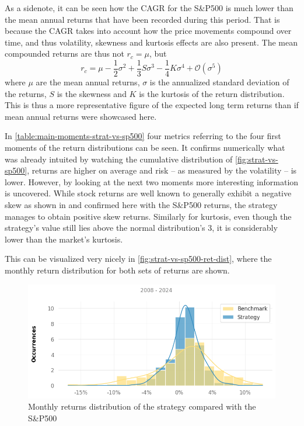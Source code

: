 As a sidenote, it can be seen how the CAGR for the S\&P500 is much lower than the mean annual returns that have been recorded during this period. That is because the CAGR takes into account how the price movements compound over time, and thus volatility, skewness and kurtosis effects are also present. The mean compounded returns are thus not $r_c=\mu$, but 
\begin{equation}
    r_c=\mu-\frac{1}{2}\sigma^2+\frac{1}{3}S\sigma^3-\frac{1}{4}K\sigma^4  + \mathcal{O}\left(\sigma^5\right)
\end{equation}
where $\mu$ are the mean annual returns, $\sigma$ is the annualized standard deviation of the returns, $S$ is the skewness and $K$ is the kurtosis of the return distribution. This is thus a more representative figure of the expected long term returns than if mean annual returns were showcased here.

In \autoref{table:main-moments-strat-vs-sp500} four metrics referring to the four first moments of the return distributions can be seen. 
It confirms numerically what was already intuited by watching the cumulative distribution of \autoref{fig:strat-vs-sp500}, returns are higher on average and risk -- as measured by the volatility -- is lower. However, by looking at the next two moments more interesting information is uncovered. While stock returns are well known to generally exhibit a negative skew as shown in \cite{peiro_1999} and confirmed here with the S\&P500 returns, the strategy manages to obtain positive skew returns. Similarly for kurtosis, even though the strategy's value still lies above the normal distribution's 3, it is considerably lower than the market's kurtosis.

This can be visualized very nicely in \autoref{fig:strat-vs-sp500-ret-dist}, where the monthly return distribution for both sets of returns are shown. 

\begin{figure}[ht]
    \includegraphics[width=\linewidth]{assets/strat-vs-sp500-ret-dist.png}
    \caption{Monthly returns distribution of the strategy compared with the S\&P500}
    \label{fig:strat-vs-sp500-ret-dist}
\end{figure}


